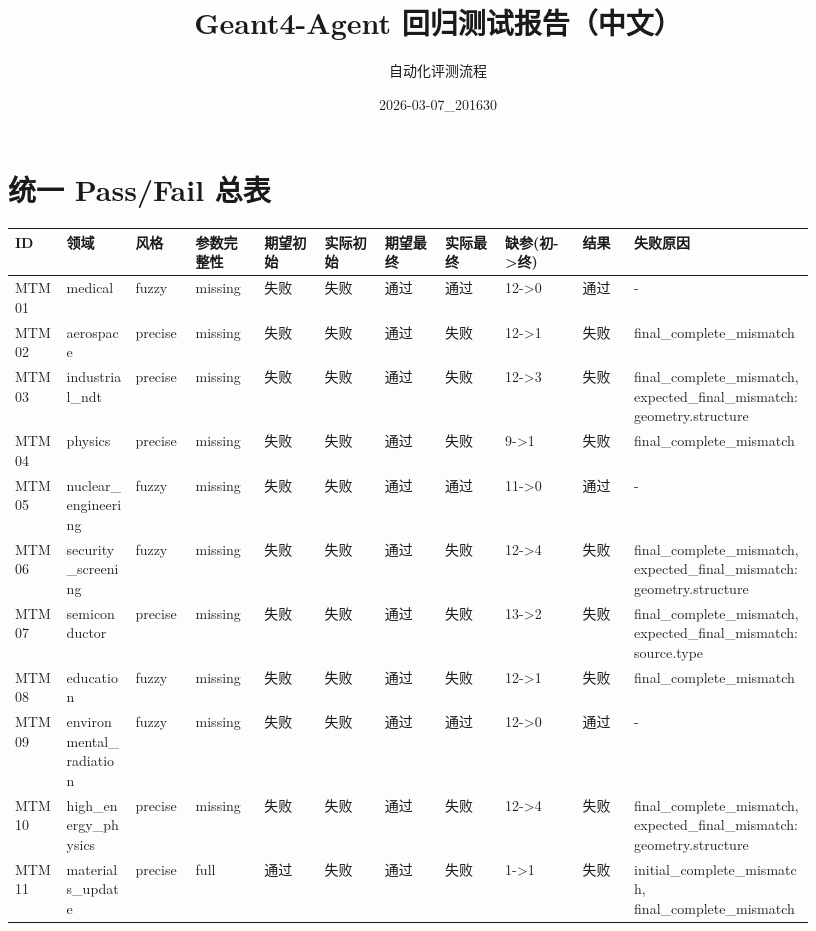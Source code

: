 \documentclass[11pt]{ctexart}
\title{Geant4-Agent 回归测试报告（中文）}
\author{自动化评测流程}
\date{2026-03-07\_201630}
\begin{document}
\maketitle
\section{统一 Pass/Fail 总表}
\begin{longtable}{p{0.06\linewidth}p{0.08\linewidth}p{0.07\linewidth}p{0.08\linewidth}p{0.07\linewidth}p{0.07\linewidth}p{0.07\linewidth}p{0.07\linewidth}p{0.09\linewidth}p{0.06\linewidth}p{0.21\linewidth}}
\toprule
ID & 领域 & 风格 & 参数完整性 & 期望初始 & 实际初始 & 期望最终 & 实际最终 & 缺参(初->终) & 结果 & 失败原因 \\
\midrule
MTM01 & medical & fuzzy & missing & 失败 & 失败 & 通过 & 通过 & 12->0 & 通过 & - \\
MTM02 & aerospace & precise & missing & 失败 & 失败 & 通过 & 失败 & 12->1 & 失败 & final\_complete\_mismatch \\
MTM03 & industrial\_ndt & precise & missing & 失败 & 失败 & 通过 & 失败 & 12->3 & 失败 & final\_complete\_mismatch, expected\_final\_mismatch:geometry.structure \\
MTM04 & physics & precise & missing & 失败 & 失败 & 通过 & 失败 & 9->1 & 失败 & final\_complete\_mismatch \\
MTM05 & nuclear\_engineering & fuzzy & missing & 失败 & 失败 & 通过 & 通过 & 11->0 & 通过 & - \\
MTM06 & security\_screening & fuzzy & missing & 失败 & 失败 & 通过 & 失败 & 12->4 & 失败 & final\_complete\_mismatch, expected\_final\_mismatch:geometry.structure \\
MTM07 & semiconductor & precise & missing & 失败 & 失败 & 通过 & 失败 & 13->2 & 失败 & final\_complete\_mismatch, expected\_final\_mismatch:source.type \\
MTM08 & education & fuzzy & missing & 失败 & 失败 & 通过 & 失败 & 12->1 & 失败 & final\_complete\_mismatch \\
MTM09 & environmental\_radiation & fuzzy & missing & 失败 & 失败 & 通过 & 通过 & 12->0 & 通过 & - \\
MTM10 & high\_energy\_physics & precise & missing & 失败 & 失败 & 通过 & 失败 & 12->4 & 失败 & final\_complete\_mismatch, expected\_final\_mismatch:geometry.structure \\
MTM11 & materials\_update & precise & full & 通过 & 失败 & 通过 & 失败 & 1->1 & 失败 & initial\_complete\_mismatch, final\_complete\_mismatch \\

\end{longtable}
\end{document}
